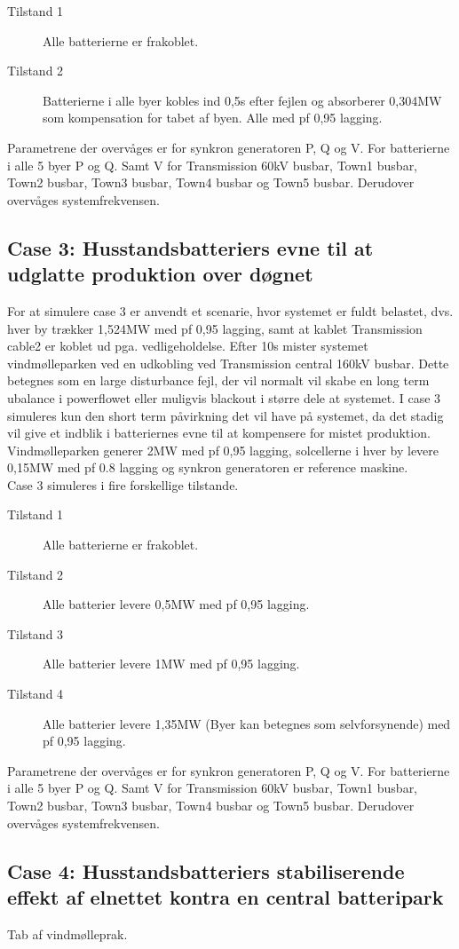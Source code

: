 \begin{description}
	\item[Tilstand 1] Alle batterierne er frakoblet.
	\item[Tilstand 2] Batterierne i alle byer kobles ind 0,5s efter fejlen og absorberer 0,304MW som kompensation for tabet af byen. Alle med pf 0,95 lagging.
\end{description}

Parametrene der overvåges er for synkron generatoren P, Q og V.
For batterierne i alle 5 byer P og Q. Samt V for Transmission 60kV busbar, Town1 busbar, Town2 busbar, Town3 busbar, Town4 busbar og Town5 busbar.
Derudover overvåges systemfrekvensen.

\subsection{Case 3: Husstandsbatteriers evne til at udglatte produktion over døgnet}
For at simulere case 3 er anvendt et scenarie, hvor systemet er fuldt belastet, dvs. hver by trækker 1,524MW med pf 0,95 lagging, samt at kablet Transmission cable2 er koblet ud pga. vedligeholdelse. Efter 10s mister systemet vindmølleparken ved en udkobling ved Transmission central 160kV busbar. Dette betegnes som en large disturbance fejl, der vil normalt vil skabe en long term ubalance i powerflowet eller muligvis blackout i større dele at systemet. I case 3 simuleres kun den short term påvirkning det vil have på systemet, da det stadig vil give et indblik i batteriernes evne til at kompensere for mistet produktion.\\
Vindmølleparken generer 2MW med pf 0,95 lagging, solcellerne i hver by levere 0,15MW med pf 0.8 lagging og synkron generatoren er reference maskine.\\
Case 3 simuleres i fire forskellige tilstande.

\begin{description}
	\item[Tilstand 1] Alle batterierne er frakoblet.
	\item[Tilstand 2] Alle batterier levere 0,5MW med pf 0,95 lagging.
	\item[Tilstand 3] Alle batterier levere 1MW med pf 0,95 lagging.
	\item[Tilstand 4] Alle batterier levere 1,35MW (Byer kan betegnes som selvforsynende) med pf 0,95 lagging.
\end{description}

Parametrene der overvåges er for synkron generatoren P, Q og V.
For batterierne i alle 5 byer P og Q. Samt V for Transmission 60kV busbar, Town1 busbar, Town2 busbar, Town3 busbar, Town4 busbar og Town5 busbar.
Derudover overvåges systemfrekvensen.

\subsection{Case 4: Husstandsbatteriers stabiliserende effekt af elnettet kontra en central batteripark}
Tab af vindmølleprak.